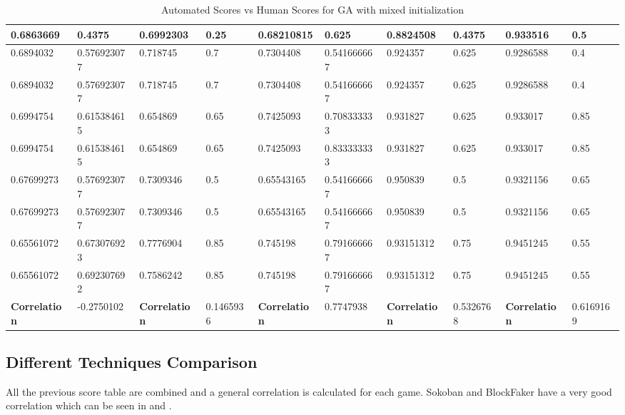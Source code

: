 \begin{landscape}
\begin{table}[!ht]
\begin{tabular}{|p{0.8in}|p{0.8in}|p{0.8in}|p{0.8in}|p{0.8in}|p{0.8in}|p{0.8in}|p{0.8in}|p{0.8in}|p{0.8in}|}
		\hline
		0.6863669 & 0.4375 & 0.6992303 & 0.25 & 0.68210815 & 0.625 & 0.8824508 & 0.4375 & 0.933516 & 0.5\\
		\hline
		0.6894032 & 0.576923077 & 0.718745 & 0.7 & 0.7304408 & 0.541666667 & 0.924357 & 0.625 & 0.9286588 & 0.4\\
		\hline
		0.6894032 & 0.576923077 & 0.718745 & 0.7 & 0.7304408 & 0.541666667 & 0.924357 & 0.625 & 0.9286588 & 0.4\\
		\hline
		0.6994754 & 0.615384615 & 0.654869 & 0.65 & 0.7425093 & 0.708333333 & 0.931827 & 0.625 & 0.933017 & 0.85\\
		\hline
		0.6994754 & 0.615384615 & 0.654869 & 0.65 & 0.7425093 & 0.833333333 & 0.931827 & 0.625 & 0.933017 & 0.85\\
		\hline
		0.67699273 & 0.576923077 & 0.7309346 & 0.5 & 0.65543165 & 0.541666667 & 0.950839 & 0.5 & 0.9321156 & 0.65\\
		\hline
		0.67699273 & 0.576923077 & 0.7309346 & 0.5 & 0.65543165 & 0.541666667 & 0.950839 & 0.5 & 0.9321156 & 0.65\\
		\hline
		0.65561072 & 0.673076923 & 0.7776904 & 0.85 & 0.745198 & 0.791666667 & 0.93151312 & 0.75 & 0.9451245 & 0.55\\
		\hline
		0.65561072 & 0.692307692 & 0.7586242 & 0.85 & 0.745198 & 0.791666667 & 0.93151312 & 0.75 & 0.9451245 & 0.55\\
		\hline
		\textbf{Correlation} & -0.2750102 & \textbf{Correlation} & 0.1465936 & \textbf{Correlation} & 0.7747938 & \textbf{Correlation} & 0.5326768 & \textbf{Correlation} & 0.6169169\\
		\hline
	\end{tabular}
	\caption{Automated Scores vs Human Scores for GA with mixed initialization}
	\label{Table:mixedGAScores}
\end{table}
\end{landscape}

\subsection{Different Techniques Comparison}
All the previous score table are combined and a general correlation is calculated for each game. Sokoban and BlockFaker have a very good correlation which can be seen in  and .


